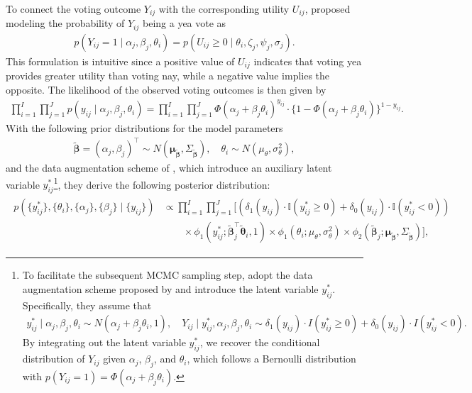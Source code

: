 \documentclass[11pt]{article}
\begin{document}
To connect the voting outcome $ Y_{ij} $ with the corresponding utility $ U_{ij} $, \cite{Clinton2004} proposed modeling the probability of $ Y_{ij} $ being a yea vote as
\begin{align*}
    p(Y_{ij} = 1 \mid \alpha_j, \beta_j, \theta_i) = p(U_{ij} \geq 0 \mid \theta_i, \zeta_j, \psi_j, \sigma_j).
\end{align*}
This formulation is intuitive since a positive value of $U_{ij}$ indicates that voting yea provides greater utility than voting nay, while a negative value implies the opposite.
The likelihood of the observed voting outcomes is then given by
\begin{align}\label{eqn:like}
    \prod_{i=1}^I \prod_{j=1}^J p(y_{ij} \mid \alpha_j, \beta_j, \theta_i) = \prod_{i=1}^I \prod_{j=1}^J \Phi(\alpha_j + \beta_j \theta_i)^{y_{ij}} \cdot \{1-\Phi(\alpha_j + \beta_j \theta_i)\}^{1-y_{ij}}.
\end{align}  
With the following prior distributions for the model parameters
\begin{align}\label{eqn:prior_abt}
    \boldsymbol{\tilde{\beta}} = (\alpha_j, \beta_j)^\top \sim N(\boldsymbol{\mu}_{\boldsymbol{\tilde{\beta}}}, \Sigma_{\boldsymbol{\tilde{\beta}}}), \quad \theta_i \sim N(\mu_{\theta}, \sigma_{\theta}^2),
\end{align}  
and the data augmentation scheme of \cite{AlbertChib1993}, which introduce an auxiliary latent variable $ y_{ij}^* $\footnote{To facilitate the subsequent MCMC sampling step, \cite{Clinton2004} adopt the data augmentation scheme proposed by \cite{AlbertChib1993} and introduce the latent variable $ y_{ij}^* $. Specifically, they assume that  
\begin{align*}
y_{ij}^* \mid \alpha_j, \beta_j, \theta_i \sim N(\alpha_j + \beta_j \theta_i, 1),\quad 
Y_{ij} \mid y_{ij}^*, \alpha_j, \beta_j, \theta_i \sim \delta_1(y_{ij}) \cdot I(y_{ij}^* \geq 0) + \delta_0(y_{ij}) \cdot I(y_{ij}^* < 0).
\end{align*}
By integrating out the latent variable $ y_{ij}^* $, we recover the conditional distribution of $ Y_{ij} $ given $ \alpha_j $, $ \beta_j $, and $ \theta_i $, which follows a Bernoulli distribution with $p(Y_{ij} = 1) = \Phi(\alpha_j + \beta_j \theta_i)$.}, they derive the following posterior distribution:
\begin{align}\label{eqn:post_BIRT}
    \begin{split}
        p\left(\{y_{ij}^*\}, \{\theta_i\}, \{\alpha_j\}, \{\beta_j\} \mid \{y_{ij}\}\right) 
        &\propto \prod_{i=1}^I \prod_{j = 1}^J 
        \bigg[\left(\delta_1(y_{ij})  \cdot \mathbb{I}(y_{ij}^* \geq 0) + \delta_0(y_{ij}) \cdot \mathbb{I}(y_{ij}^* < 0) \right) \\
        &\quad \quad \times \phi_1\left(y_{ij}^*; \boldsymbol{\tilde{\beta}}_j^\top \boldsymbol{\tilde{\theta}}_i, 1\right) \times \phi_{1}\left(\theta_i; \mu_{\theta}, \sigma_{\theta}^2 \right) \times \phi_{2}\left(\boldsymbol{\tilde{\beta}}_j ; \boldsymbol{\mu}_{\boldsymbol{\tilde{\beta}}}, \Sigma_{\boldsymbol{\tilde{\beta}}}\right)\bigg],
    \end{split}
\end{align}  
\end{document}
